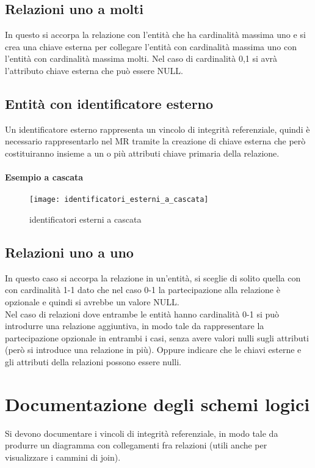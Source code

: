 \subsection{Relazioni uno a molti}
In questo si accorpa la relazione con l'entità che ha cardinalità massima uno e si crea
una chiave esterna per collegare l'entità con cardinalità massima uno con l'entità
con cardinalità massima molti. Nel caso di cardinalità 0,1 si avrà l'attributo chiave esterna che può essere NULL.
\subsection{Entità con identificatore esterno}
Un identificatore esterno rappresenta un vincolo di integrità referenziale, quindi è 
necessario rappresentarlo nel MR tramite la creazione di chiave esterna che però costituiranno
insieme a un o più attributi chiave primaria della relazione.
\paragraph*{Esempio a cascata}
\begin{figure}[h]
    \centering
    \texttt{[image: identificatori\_esterni\_a\_cascata]}
    \caption{identificatori esterni a cascata}
    \label{fig:id-esterni-cascata}
\end{figure}
\subsection{Relazioni uno a uno}
In questo caso si accorpa la relazione in un'entità, si sceglie di solito quella con con cardinalità 1-1 dato
che nel caso 0-1 la partecipazione alla relazione è opzionale e quindi si avrebbe un valore NULL.\\
Nel caso di relazioni dove entrambe le entità hanno cardinalità 0-1 si può introdurre una relazione aggiuntiva, 
in modo tale da rappresentare la partecipazione opzionale in entrambi i casi, senza avere valori nulli
sugli attributi (però si introduce una relazione in più). Oppure indicare che le chiavi esterne e gli attributi
della relazioni possono essere nulli.
\section{Documentazione degli schemi logici}
Si devono documentare i vincoli di integrità referenziale, in modo tale da produrre un diagramma con
collegamenti fra relazioni (utili anche per visualizzare i cammini di join).

